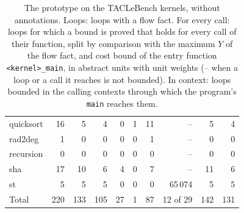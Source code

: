 \documentclass[oneside,english]{amsart}
\numberwithin{equation}{section}
\numberwithin{figure}{section}
\theoremstyle{plain}
\theoremstyle{definition}
\theoremstyle{plain}
\theoremstyle{remark}
\theoremstyle{plain}
\theoremstyle{definition}
\theoremstyle{plain}
\theoremstyle{remark}
\begin{document}
\begin{table}[ht]
\begin{tabular}{@{}lrrrrrrrrr@{}}
quicksort & 16 & 5 & 4 & 0 & 1 & 11 & -- & 5 & 4 \\
rad2deg & 1 & 0 & 0 & 0 & 0 & 1 & -- & 0 & 0 \\
recursion & 0 & 0 & 0 & 0 & 0 & 0 & -- & 0 & 0 \\
sha & 17 & 10 & 6 & 4 & 0 & 7 & -- & 11 & 6 \\
st & 5 & 5 & 5 & 0 & 0 & 0 & 65\,074 & 5 & 5 \\
\midrule
Total & 220 & 133 & 105 & 27 & 1 & 87 & 12 of 29 & 142 & 131 \\
\bottomrule
\end{tabular}
\caption{The prototype on the TACLeBench kernels, without annotations. Loops: loops with a flow fact. For every call: loops for which a bound is proved that holds for every call of their function, split by comparison with the maximum $Y$ of the flow fact, and cost bound of the entry function \texttt{<kernel>\_main}, in abstract units with unit weights (-- when a loop or a call it reaches is not bounded). In context: loops bounded in the calling contexts through which the program's \texttt{main} reaches them.}
\label{tab:tacle}
\end{table}
\end{document}
